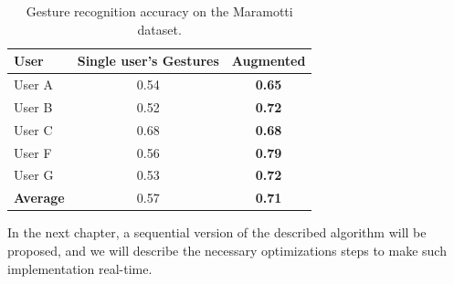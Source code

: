 \begin{table}[tb]
\renewcommand{\arraystretch}{1.3}
\caption{Gesture recognition accuracy on the Maramotti dataset.}
\label{gesture_comparison_maramotti}
\centering
\begin{tabular}{lcc}
\hline
\textbf{User}					& \textbf{Single user's Gestures} 	& \textbf{Augmented}  \\
\hline
User A						& 0.54 			& \textbf{0.65} \\		%
User B			 				& 0.52 			& \textbf{0.72} \\		%
User C			 			& 0.68 			& \textbf{0.68} \\		%
User F					 		& 0.56 			& \textbf{0.79} \\		%
User G						& 0.53 			& \textbf{0.72} \\		%
\hline
\textbf{Average}					& 0.57	  		& \textbf{0.71} \\
\hline
\end{tabular}
\end{table}

In the next chapter, a sequential version of the described algorithm will be proposed, and we will describe the necessary optimizations steps to make such implementation real-time.